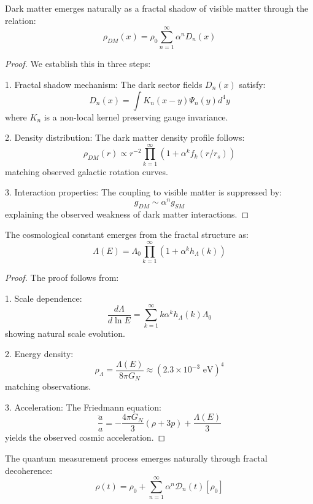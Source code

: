 \documentclass{article}
\begin{document}
\begin{theorem}
Dark matter emerges naturally as a fractal shadow of visible matter through the relation:
\[
\rho_{DM}(x) = \rho_0 \sum_{n=1}^{\infty} \alpha^n D_n(x)
\]
\end{theorem}

\begin{proof}
We establish this in three steps:

1. Fractal shadow mechanism:
   The dark sector fields $D_n(x)$ satisfy:
   \[
   D_n(x) = \int K_n(x-y)\Psi_n(y)d^4y
   \]
   where $K_n$ is a non-local kernel preserving gauge invariance.

2. Density distribution:
   The dark matter density profile follows:
   \[
   \rho_{DM}(r) \propto r^{-2}\prod_{k=1}^{\infty}(1 + \alpha^k f_k(r/r_s))
   \]
   matching observed galactic rotation curves.

3. Interaction properties:
   The coupling to visible matter is suppressed by:
   \[
   g_{DM} \sim \alpha^n g_{SM}
   \]
   explaining the observed weakness of dark matter interactions.
\end{proof}

\begin{theorem}
The cosmological constant emerges from the fractal structure as:
\[
\Lambda(E) = \Lambda_0 \prod_{k=1}^{\infty} (1 + \alpha^k h_\Lambda(k))
\]
\end{theorem}

\begin{proof}
The proof follows from:

1. Scale dependence:
   \[
   \frac{d\Lambda}{d\ln E} = \sum_{k=1}^{\infty} k\alpha^k h_\Lambda(k)\Lambda_0
   \]
   showing natural scale evolution.

2. Energy density:
   \[
   \rho_\Lambda = \frac{\Lambda(E)}{8\pi G_N} \approx (2.3 \times 10^{-3} \text{ eV})^4
   \]
   matching observations.

3. Acceleration:
   The Friedmann equation:
   \[
   \frac{\ddot{a}}{a} = -\frac{4\pi G_N}{3}(\rho + 3p) + \frac{\Lambda(E)}{3}
   \]
   yields the observed cosmic acceleration.
\end{proof}

\begin{theorem}
The quantum measurement process emerges naturally through fractal decoherence:
\[
\rho(t) = \rho_0 + \sum_{n=1}^{\infty} \alpha^n \mathcal{D}_n(t)[\rho_0]
\]
\end{theorem}
\end{document}

